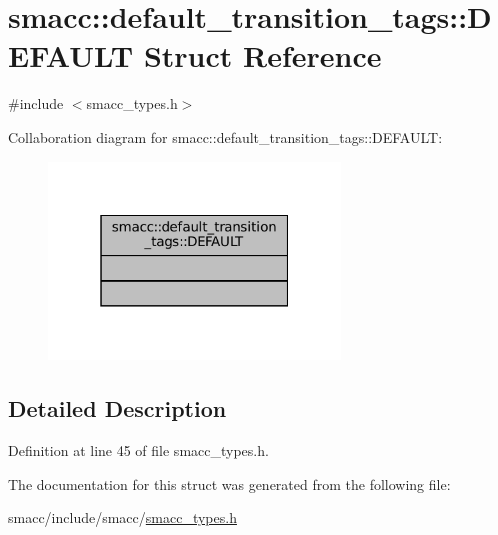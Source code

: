 \hypertarget{structsmacc_1_1default__transition__tags_1_1DEFAULT}{}\section{smacc\+:\+:default\+\_\+transition\+\_\+tags\+:\+:D\+E\+F\+A\+U\+LT Struct Reference}
\label{structsmacc_1_1default__transition__tags_1_1DEFAULT}


{\ttfamily \#include $<$smacc\+\_\+types.\+h$>$}



Collaboration diagram for smacc\+:\+:default\+\_\+transition\+\_\+tags\+:\+:D\+E\+F\+A\+U\+LT\+:
\nopagebreak
\begin{figure}[H]
\begin{center}
\leavevmode
\includegraphics[width=220pt]{structsmacc_1_1default__transition__tags_1_1DEFAULT__coll__graph}
\end{center}
\end{figure}


\subsection{Detailed Description}


Definition at line 45 of file smacc\+\_\+types.\+h.



The documentation for this struct was generated from the following file\+:\begin{DoxyCompactItemize}
\item 
smacc/include/smacc/\hyperlink{smacc__types_8h}{smacc\+\_\+types.\+h}\end{DoxyCompactItemize}
